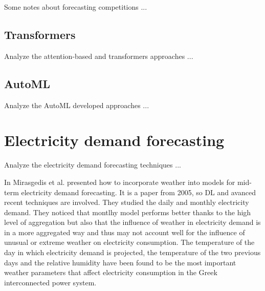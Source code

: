Some notes about forecasting competitions ...
\cite{HYNDMAN20207}
\cite{SPILIOTIS202037}


\vspace{0.1 cm}
\subsection{Transformers}
\label{sec:transformers}
\vspace{0.1 cm}

Analyze the attention-based and transformers approaches ...
\cite{Grigsby2021}
\cite{Wu2020}
\cite{Zhou2020}
\cite{Vaswani2017}
\cite{NIU202148}
\cite{LIM20211748}
\cite{LIU2020113082}
\cite{Shih2019}
\cite{WU2022123990}
\cite{ZHANG2022329}
\cite{9745215}
\cite{10019616}
\cite{9676694}
\cite{9892274}
\cite{9586824}
\cite{9688968}
\cite{HEIDARI2020626}

\vspace{0.1 cm}
\subsection{AutoML}
\label{sec:automl}
\vspace{0.1 cm}

Analyze the AutoML developed approaches ...
\cite{HE2021106622}
\cite{Gijsbers2019}
\cite{Feurer2020}
\cite{Zimmer2020}
\cite{Deng2022}
\cite{su142215292}
\cite{Karmaker2021}
\cite{Chen2021}
\cite{computers10010011}
\cite{Elshawi2019}
\cite{Feurer2015}
\cite{9534091}
\cite{9579526}
\cite{9660073}
\cite{8955514}
\cite{8995391}
\cite{9033810}
\cite{9564380}


\section{Electricity demand forecasting}
\label{sec:demandsoa}
\vspace{0.2 cm}

Analyze the electricity demand forecasting techniques ...

In \cite{MIRASGEDIS2006208} Mirasgedis et al. presented how to incorporate weather into models for mid-term electricity demand forecasting.
It is a paper from 2005, so DL and avanced recent techniques are involved.
They studied the daily and monthly electricity demand.
They noticed that montlhy model performs better thanks to the high level of aggregation but also that the influence of weather in electricity demand is in a more aggregated way and thus may not account well for the influence of unusual or extreme weather on electricity consumption.
The temperature of the day in which electricity demand is projected, the temperature of the two previous days and the relative humidity have been found to be the most important weather parameters that affect electricity consumption in the Greek interconnected power system.

